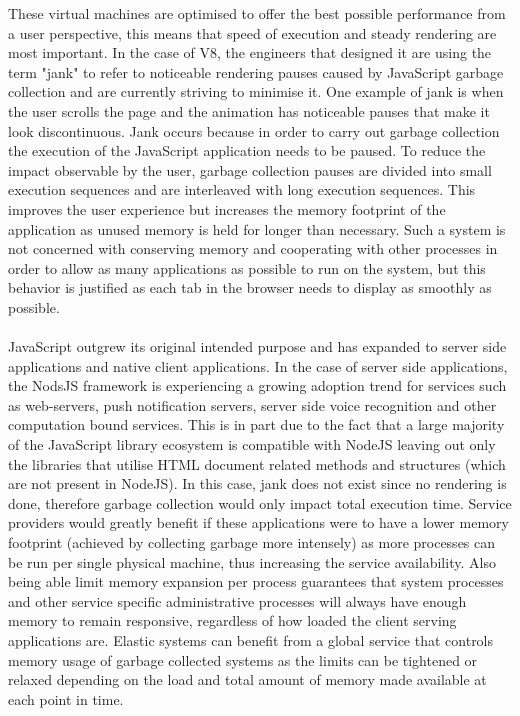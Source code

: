 \documentclass{l4proj}
\begin{document}
\hspace*{3em} These virtual machines are optimised to offer the best possible performance from a user perspective, this means that speed of execution and steady rendering are most important. In the case of V8, the engineers that designed it are using the term "jank" to refer to noticeable rendering pauses caused by JavaScript garbage collection and are currently striving to minimise it. One example of jank is when the user scrolls the page and the animation has noticeable pauses that make it look discontinuous. Jank occurs because in order to carry out garbage collection the execution of the JavaScript application needs to be paused. To reduce the impact observable by the user, garbage collection pauses are divided into small execution sequences and are interleaved with long execution sequences. This improves the user experience but increases the memory footprint of the application as unused memory is held for longer than necessary. Such a system is not concerned with conserving memory and cooperating with other processes in order to allow as many applications as possible to run on the system, but this behavior is justified as each tab in the browser needs to display as smoothly as possible.
\\\\%
\hspace*{3em} JavaScript outgrew its original intended purpose and has expanded to server side applications and native client applications. In the case of server side applications, the NodsJS framework is experiencing a growing adoption trend for services such as web-servers, push notification servers, server side voice recognition and other computation bound services. This is in part due to the fact that a large majority of the JavaScript library ecosystem is compatible with NodeJS leaving out only the libraries that utilise HTML document related methods and structures (which are not present in NodeJS). In this case, jank does not exist since no rendering is done, therefore garbage collection would only impact total execution time. Service providers would greatly benefit if these applications were to have a lower memory footprint (achieved by collecting garbage more intensely) as more processes can be run per single physical machine, thus increasing the service availability. Also being able limit memory expansion per process guarantees that system processes and other service specific administrative processes will always have enough memory to remain responsive, regardless of how loaded the client serving applications are. Elastic systems can benefit from a global service that controls memory usage of garbage collected systems as the limits can be tightened or relaxed depending on the load and total amount of memory made available at each point in time.\\%
\end{document}

